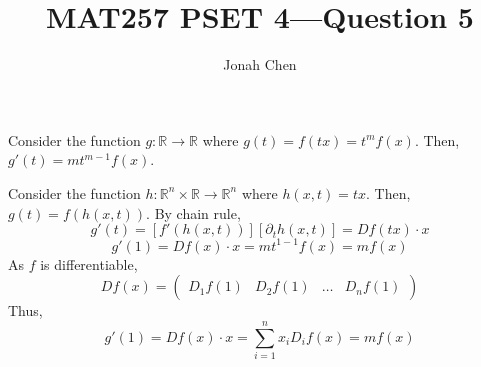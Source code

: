 \documentclass{exam}
\title{MAT257 PSET 4---Question 5}
\author{Jonah Chen}
\numberwithin{equation}{section}
\newcommand{\R}{\mathbb{R}}
\begin{document}
    \sffamily
    \maketitle

    Consider the function $g:\R\to\R$ where $g(t)=f(tx)=t^mf(x)$. Then, $g'(t)=mt^{m-1}f(x)$. 
    
    Consider the function $h:\R^n\times\R\to\R^n$ where $h(x,t)=tx$. Then, $g(t)=f(h(x,t))$. By chain rule, $$g'(t)=[f'(h(x,t))] [\partial_t h(x,t)]=Df(tx)\cdot x$$
    $$g'(1)=Df(x)\cdot x=mt^{1-1}f(x)=mf(x)$$
    As $f$ is differentiable, $$Df(x)=\begin{pmatrix}
        D_1f(1) & D_2f(1) & \dots & D_nf(1)
    \end{pmatrix}$$ 
    Thus, $$g'(1)=Df(x)\cdot x=\sum_{i=1}^nx_iD_if(x)=mf(x)$$
\end{document}
